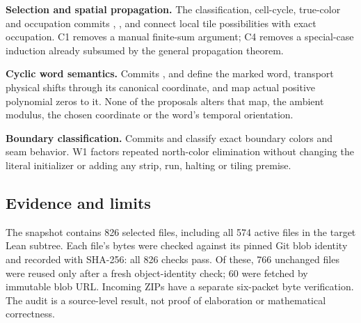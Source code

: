 \textbf{Selection and spatial propagation.} The classification,
cell-cycle, true-color and occupation commits
, ,  and
 connect local tile possibilities with exact occupation.
C1 removes a manual finite-sum argument; C4 removes a special-case induction
already subsumed by the general propagation theorem.

\textbf{Cyclic word semantics.} Commits ,
 and  define the marked word, transport
physical shifts through its canonical coordinate, and map actual positive
polynomial zeros to it. None of the proposals alters that map, the ambient
modulus, the chosen coordinate or the word's temporal orientation.

\textbf{Boundary classification.} Commits
\href{https://github.com/VladimirReshetnikov/ProveIt/commit/9cef0257dde4cdc80f35121b7ea0450df316548c}{}
and
\href{https://github.com/VladimirReshetnikov/ProveIt/commit/73d3d8e9c04d5362012dc1c1c1cce1ada97ac139}{}
classify exact boundary colors and seam behavior. W1 factors repeated
north-color elimination without changing the literal initializer or adding
any strip, run, halting or tiling premise.

\subsection{Evidence and limits}

The snapshot contains 826 selected files, including all 574 active
 files in the target Lean subtree. Each file's bytes were checked
against its pinned Git blob identity and recorded with SHA-256: all 826
checks pass. Of these, 766 unchanged files were reused only after a fresh
object-identity check; 60 were fetched by immutable blob URL. Incoming ZIPs
have a separate six-packet byte verification. The audit is a source-level
result, not proof of elaboration or mathematical correctness.
